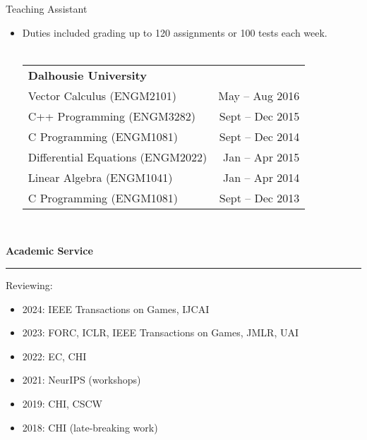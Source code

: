 \documentclass{article}
\newcommand{\heading}[1]
{
	\vspace{3pt}
	{\bf #1} 
	\vspace{-6pt}
	
	\rule{\linewidth}{0.4pt}
}
\begin{document}
Teaching Assistant
\begin{itemize}
	\item Duties included grading up to 120 assignments or 100 tests each week. \\~\\
	\begin{tabularx}{\linewidth}{Xr}
		\textbf{Dalhousie University}	\\
		Vector Calculus (ENGM2101) & May -- Aug 2016 \\
		C++ Programming (ENGM3282) & Sept -- Dec 2015 \\
		C Programming (ENGM1081) & Sept -- Dec 2014 \\
		Differential Equations (ENGM2022) & Jan -- Apr 2015 \\
		Linear Algebra (ENGM1041) & Jan -- Apr 2014 \\
		C Programming (ENGM1081) & Sept -- Dec 2013 \\
	\end{tabularx} ~\\
\end{itemize}


\heading{Academic Service}
Reviewing:
\begin{itemize}
    \item 2024: IEEE Transactions on Games, IJCAI
    \item 2023: FORC, ICLR, IEEE Transactions on Games, JMLR, UAI
    \item 2022: EC, CHI
    \item 2021: NeurIPS (workshops)
    \item 2019: CHI, CSCW
    \item 2018: CHI (late-breaking work)
\end{itemize}
\end{document}
